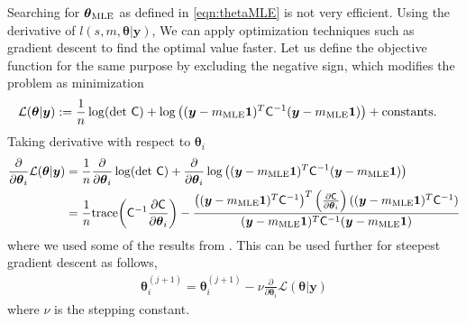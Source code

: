 \documentclass{iitthesis}          %
\newcommand{\bm}[1]{\boldsymbol{#1}}
\newcommand{\trace}[1]{\textup{trace}{#1}}
\newcommand{\vtheta}{{\bm{\theta}}}
\newcommand{\vy}{\bm{y}}
\newcommand{\vone}{\bm{1}}
\newcommand{\mC}{\mathsf{C}}
\newcommand{\mCInv}{{\mathsf{C}^{-1}}}
\newcommand{\MLE}{\textup{MLE}}
\begin{document}
 \label{grad_descent_MLE}
Searching for $\vtheta_\MLE$ as defined in \eqref{eqn:thetaMLE} is not very efficient. Using the derivative of $l(s,m,\vtheta | \vy)$, We can apply optimization techniques such as gradient descent to find the optimal value faster. Let us define the objective function for the same purpose by excluding the negative sign, which modifies the problem as minimization
\begin{align*}
\mathcal{L}(\vtheta | \vy)
&:= \frac{1}{n} \log(\det\, \mC) +  \log\left( (\vy-m_\MLE\vone)^T\mCInv(\vy-m_\MLE\vone) \right) + \text{constants.}
\end{align*}
Taking derivative with respect to $\vtheta_i$
\begin{align*}
\frac{\partial}{\partial \vtheta_i} \mathcal{L}(\vtheta | \vy)
&=  \frac{1}{n} \frac{\partial}{\partial \vtheta_i} \log(\det\, \mC) + \frac{\partial}{\partial \vtheta_i} 
\log\left((\vy-m_\MLE\vone)^T\mCInv(\vy-m_\MLE\vone) \right)
\\
&= \frac 1n \trace{\left( \mCInv \frac{\partial \mC}{\partial \vtheta_i} \right)}
- 
\frac
{\left((\vy-m_\MLE\vone)^T\mCInv\right)^T 
	\left( \frac{\partial \mC}{\partial \vtheta_i} \right)
	((\vy-m_\MLE\vone)^T\mCInv)}
{(\vy-m_\MLE\vone)^T\mCInv(\vy-m_\MLE\vone)}
\end{align*}
where we used some of the results from \cite{Dong2017a}. 
This can be used further for steepest gradient descent as follows,
\begin{align}
\label{eqn:deep_descent}
\vtheta_i^{(j+1)} = \vtheta_i^{(j+1)} - \nu \frac{\partial}{\partial \vtheta_i} \mathcal{L}(\vtheta | \vy)
\end{align}
where $\nu$ is the stepping constant. 
\end{document}
